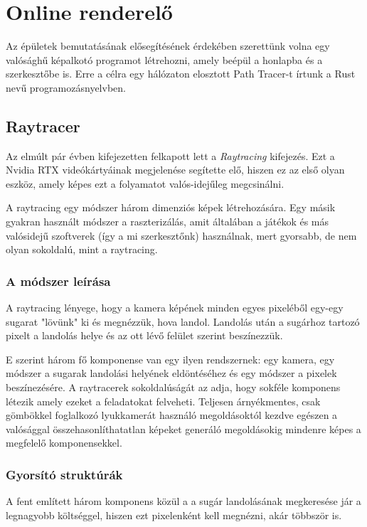 \section{Online renderelő}

Az épületek bemutatásának elősegítésének érdekében szerettünk volna egy valósághű képalkotó programot létrehozni, amely beépül a honlapba és a szerkesztőbe is. Erre a célra egy hálózaton elosztott Path Tracer-t írtunk a Rust nevű programozásnyelvben.

\subsection{Raytracer}
Az elmúlt pár évben kifejezetten felkapott lett a \emph{Raytracing} kifejezés. Ezt a Nvidia RTX videókártyáinak megjelenése segítette elő, hiszen ez az első olyan eszköz, amely képes ezt a folyamatot valós-idejűleg megcsinálni. 

A raytracing egy módszer három dimenziós képek létrehozására. Egy másik gyakran használt módszer a raszterizálás, amit általában a játékok és más valósidejű szoftverek (így a mi szerkesztőnk) használnak, mert gyorsabb, de nem olyan sokoldalú, mint a raytracing.

\subsubsection{A módszer leírása}
A raytracing lényege, hogy a kamera képének minden egyes pixeléből egy-egy sugarat "lövünk" ki és megnézzük, hova landol. Landolás után a sugárhoz tartozó pixelt a landolás helye és az ott lévő felület szerint beszínezzük.

E szerint három fő komponense van egy ilyen rendszernek: egy kamera, egy módszer a sugarak landolási helyének eldöntéséhez és egy módszer a pixelek beszínezésére. A raytracerek sokoldalúságát az adja, hogy sokféle komponens létezik amely ezeket a feladatokat felveheti. Teljesen árnyékmentes, csak gömbökkel foglalkozó lyukkamerát használó megoldásoktól kezdve egészen a valósággal összehasonlíthatatlan képeket generáló megoldásokig mindenre képes a megfelelő komponensekkel.

\subsubsection{Gyorsító struktúrák}

A fent említett három komponens közül a a sugár landolásának megkeresése jár a legnagyobb költséggel, hiszen ezt pixelenként kell megnézni, akár többször is.

